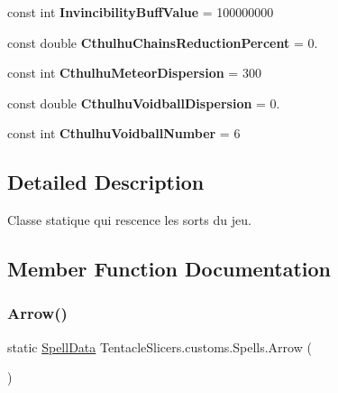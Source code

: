 \begin{DoxyCompactItemize}
const int {\bfseries Invincibility\+Buff\+Value} = 100000000
\item 
\mbox{\label{class_tentacle_slicers_1_1customs_1_1_spells_ae3a69d790bde24b4844b40b174bfb4f0}} 
const double {\bfseries Cthulhu\+Chains\+Reduction\+Percent} = 0.
\item 
\mbox{\label{class_tentacle_slicers_1_1customs_1_1_spells_a414e490cc08061ba2d9c3b12a2b2b2ac}} 
const int {\bfseries Cthulhu\+Meteor\+Dispersion} = 300
\item 
\mbox{\label{class_tentacle_slicers_1_1customs_1_1_spells_ad4f6cd75f83bb6931de35bd5b5976f3a}} 
const double {\bfseries Cthulhu\+Voidball\+Dispersion} = 0.
\item 
\mbox{\label{class_tentacle_slicers_1_1customs_1_1_spells_ab640b5aed5a31b427047425a77f7e077}} 
const int {\bfseries Cthulhu\+Voidball\+Number} = 6
\end{DoxyCompactItemize}


\subsection{Detailed Description}
Classe statique qui rescence les sorts du jeu. 



\subsection{Member Function Documentation}
\mbox{\label{class_tentacle_slicers_1_1customs_1_1_spells_aeda241fbf33bfb1ba550917d0d9cdac4}} 
\subsubsection{\texorpdfstring{Arrow()}{Arrow()}}
{\footnotesize\ttfamily static \hyperlink{class_tentacle_slicers_1_1spells_1_1_spell_data}{Spell\+Data} Tentacle\+Slicers.\+customs.\+Spells.\+Arrow (\begin{DoxyParamCaption}{ }\end{DoxyParamCaption})\hspace{0.3cm}{\ttfamily [static]}}



